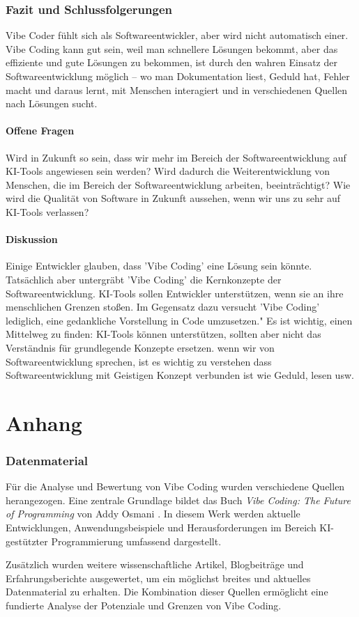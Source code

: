 \documentclass[paper=a4,fontsize=12pt,ngerman]{scrartcl}
\begin{document}
\clearpage
\section{Fazit und Schlussfolgerungen}
Vibe Coder fühlt sich als Softwareentwickler, aber wird nicht automatisch einer. 
Vibe Coding kann gut sein, weil man schnellere Lösungen bekommt, aber das effiziente und gute Lösungen zu bekommen, ist durch den wahren Einsatz der Softwareentwicklung möglich – wo man Dokumentation liest, Geduld hat, Fehler macht und daraus lernt, mit Menschen interagiert und in verschiedenen Quellen nach Lösungen sucht.

\subsection{Offene Fragen}
Wird in Zukunft so sein, dass wir mehr im Bereich der Softwareentwicklung auf KI-Tools angewiesen sein werden?  
Wird dadurch die Weiterentwicklung von Menschen, die im Bereich der Softwareentwicklung arbeiten, beeinträchtigt?  
Wie wird die Qualität von Software in Zukunft aussehen, wenn wir uns zu sehr auf KI-Tools verlassen?

\subsection{Diskussion}
Einige Entwickler glauben, dass 'Vibe Coding' 
eine Lösung sein könnte. 
Tatsächlich aber untergräbt 'Vibe Coding' die Kernkonzepte der Softwareentwicklung. 
KI-Tools sollen Entwickler unterstützen, wenn sie an ihre menschlichen Grenzen stoßen. 
Im Gegensatz dazu versucht 'Vibe Coding' lediglich, eine gedankliche Vorstellung in Code umzusetzen."
Es ist wichtig, einen Mittelweg zu finden: KI-Tools können unterstützen, sollten aber nicht das Verständnis für grundlegende Konzepte ersetzen.
wenn wir von Softwareentwicklung sprechen, ist es wichtig zu verstehen dass Softwareentwicklung mit Geistigen Konzept verbunden ist wie Geduld, lesen usw.


\clearpage
\renewcommand\refname{Literaturverzeichnis}



\clearpage
\appendix
\part*{Anhang}

\section{Datenmaterial}
Für die Analyse und Bewertung von Vibe Coding wurden verschiedene Quellen herangezogen. Eine zentrale Grundlage bildet das Buch \textit{Vibe Coding: The Future of Programming} von Addy Osmani \citep{VibeCodingTheFutureOfProgramming}. In diesem Werk werden aktuelle Entwicklungen, Anwendungsbeispiele und Herausforderungen im Bereich KI-gestützter Programmierung umfassend dargestellt.

Zusätzlich wurden weitere wissenschaftliche Artikel, Blogbeiträge und Erfahrungsberichte ausgewertet, um ein möglichst breites und aktuelles Datenmaterial zu erhalten. Die Kombination dieser Quellen ermöglicht eine fundierte Analyse der Potenziale und Grenzen von Vibe Coding.
\end{document}
